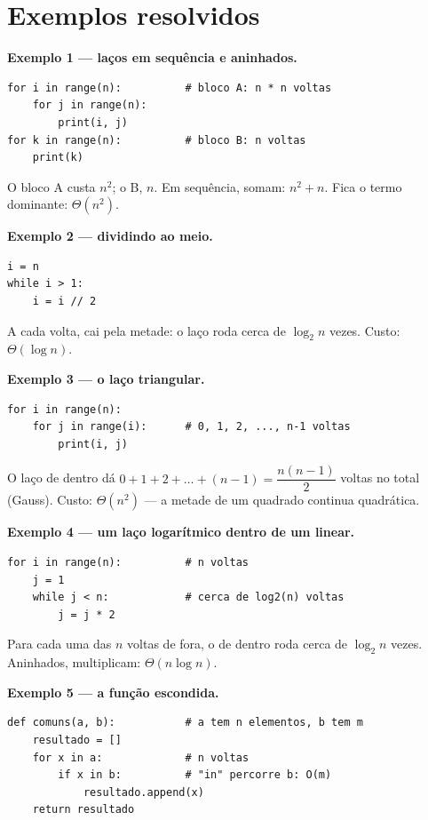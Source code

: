 \section{Exemplos resolvidos}

\textbf{Exemplo 1 — laços em sequência e aninhados.}

\begin{lstlisting}
for i in range(n):          # bloco A: n * n voltas
    for j in range(n):
        print(i, j)
for k in range(n):          # bloco B: n voltas
    print(k)
\end{lstlisting}

O bloco A custa $n^2$; o B, $n$. Em sequência, somam: $n^2 + n$. Fica o termo dominante:
$\Theta(n^2)$.

\textbf{Exemplo 2 — dividindo ao meio.}

\begin{lstlisting}
i = n
while i > 1:
    i = i // 2
\end{lstlisting}

A cada volta,  cai pela metade: o laço roda cerca de $\log_2 n$ vezes. Custo:
$\Theta(\log n)$.

\textbf{Exemplo 3 — o laço triangular.}

\begin{lstlisting}
for i in range(n):
    for j in range(i):      # 0, 1, 2, ..., n-1 voltas
        print(i, j)
\end{lstlisting}

O laço de dentro dá $0 + 1 + 2 + \dots + (n - 1) = \dfrac{n(n-1)}{2}$ voltas no total (Gauss).
Custo: $\Theta(n^2)$ — a metade de um quadrado continua quadrática.

\textbf{Exemplo 4 — um laço logarítmico dentro de um linear.}

\begin{lstlisting}
for i in range(n):          # n voltas
    j = 1
    while j < n:            # cerca de log2(n) voltas
        j = j * 2
\end{lstlisting}

Para cada uma das $n$ voltas de fora, o de dentro roda cerca de $\log_2 n$ vezes. Aninhados,
multiplicam: $\Theta(n \log n)$.

\textbf{Exemplo 5 — a função escondida.}

\begin{lstlisting}
def comuns(a, b):           # a tem n elementos, b tem m
    resultado = []
    for x in a:             # n voltas
        if x in b:          # "in" percorre b: O(m)
            resultado.append(x)
    return resultado
\end{lstlisting}

